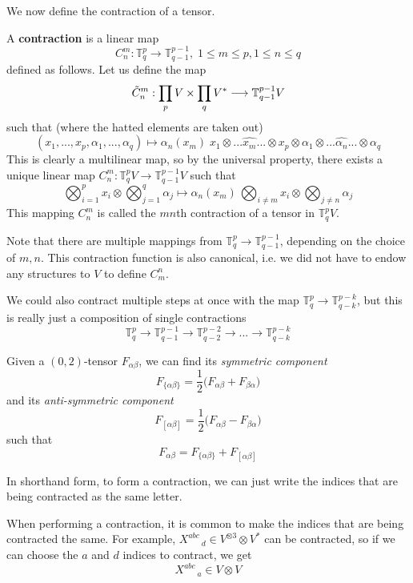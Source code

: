   We now define the contraction of a tensor. 

  \begin{definition}
  A \textbf{contraction} is a linear map
  \[C^m_n: \mathbb{T}^p_q \longrightarrow \mathbb{T}^{p-1}_{q-1}, \; 1 \leq m \leq p, 1 \leq n \leq q\]
  defined as follows. Let us define the map 
  \[\Tilde{C}^m_n: \prod_{p} V \times \prod_q V^* \longrightarrow \mathbb{T}^{p-1}_{q-1} V\]
  such that (where the hatted elements are taken out)
  \[ (x_1, ..., x_p, \alpha_1, ..., \alpha_q) \mapsto \alpha_n (x_m) \; x_1 \otimes ... \hat{x_m} ... \otimes x_p \otimes \alpha_1 \otimes ... \hat{\alpha_n} ... \otimes \alpha_q\]
  This is clearly a multilinear map, so by the universal property, there exists a unique linear map $C^m_n: \mathbb{T}^p_q V \longrightarrow \mathbb{T}^{p-1}_{q-1} V$ such that 
  \[ \bigotimes_{i=1}^p x_i \otimes \bigotimes_{j=1}^q \alpha_j \mapsto \alpha_n (x_m) \, \bigotimes_{i \neq m} x_i \otimes \bigotimes_{j \neq n} \alpha_j\]
  This mapping $C^m_n$ is called the $m n$th contraction of a tensor in $\mathbb{T}^p_q V$. 
  \end{definition}

  Note that there are multiple mappings from $\mathbb{T}^p_q \longrightarrow \mathbb{T}^{p-1}_{q-1}$, depending on the choice of $m, n$. This contraction function is also canonical, i.e. we did not have to endow any structures to $V$ to define $C^n_m$. 

  We could also contract multiple steps at once with the map $\mathbb{T}^p_q \longrightarrow \mathbb{T}^{p-k}_{q-k}$, but this is really just a composition of single contractions 
  \[\mathbb{T}^p_q \longrightarrow \mathbb{T}^{p-1}_{q-1} \longrightarrow \mathbb{T}^{p-2}_{q-2} \longrightarrow ... \longrightarrow \mathbb{T}^{p-k}_{q-k} \]

  \begin{definition}
  Given a $(0, 2)$-tensor $F_{\alpha \beta}$, we can find its \textit{symmetric component}
  \[ F_{ \{ \alpha \beta\}} = \frac{1}{2} \big(F_{\alpha \beta} + F_{\beta \alpha} \big)\]
  and its \textit{anti-symmetric component}
  \[ F_{ [ \alpha \beta]} = \frac{1}{2} \big(F_{\alpha \beta} - F_{\beta \alpha} \big)\]
  such that 
  \[ F_{\alpha \beta} = F_{ \{ \alpha \beta \}} + F_{[\alpha \beta]}\]
  \end{definition}

  In shorthand form, to form a contraction, we can just write the indices that are being contracted as the same letter. 

  \begin{example}
  When performing a contraction, it is common to make the indices that are being contracted the same. For example, $X^{a b c}_{\;\;\;\;\;\; d} \in V^{\otimes 3} \otimes V^*$ can be contracted, so if we can choose the $a$ and $d$ indices to contract, we get 
  \[X^{a b c}_{\;\;\;\;\;\; a} \in V \otimes V\]
  \end{example}

